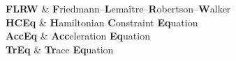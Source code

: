 \documentclass[11pt, a4paper, oneside]{Thesis} %
\begin{document}
\pagestyle{fancy}

\tableofcontents %

\listoffigures %

\listoftables %


\clearpage %


{
\textbf{FLRW} & \textbf{F}riedmann--\textbf{L}ema\^{i}tre--\textbf{R}obertson--\textbf{W}alker \\

\textbf{HCEq} & \textbf{H}amiltonian \textbf{C}onstraint \textbf{Eq}uation \\

\textbf{AccEq} & \textbf{Acc}eleration \textbf{Eq}uation \\

\textbf{TrEq} & \textbf{Tr}ace \textbf{Eq}uation \\


}


\clearpage %


\end{document}
